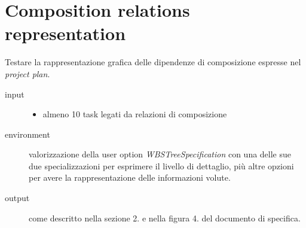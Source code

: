 \section{Composition relations representation}
Testare la rappresentazione grafica delle dipendenze di composizione espresse
nel \emph{project plan}.
\begin{description}
\item[input]  \quad
\begin{itemize}
  \item almeno 10 task legati da relazioni di composizione
\end{itemize}
\item[environment] valorizzazione della user option
\emph{WBSTreeSpecification} con una delle sue due specializzazioni per
esprimere il livello di dettaglio, pi\`u altre opzioni per avere la
rappresentazione delle informazioni volute.
\item[output] come descritto nella sezione 2. e nella figura 4. del
documento di specifica.
\end{description}

